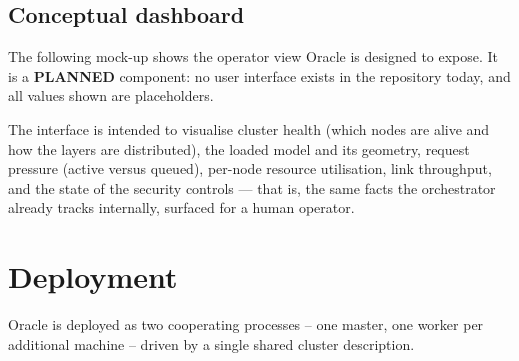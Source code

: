 \documentclass[11pt,a4paper]{article}
\newcommand{\stPlan}{\textcolor{oblue}{\footnotesize\textsf{\textbf{PLANNED}}}}
\begin{document}
\subsection{Conceptual dashboard}

The following mock-up shows the operator view Oracle is designed to expose. It is
a \stPlan{} component: no user interface exists in the repository today, and all
values shown are placeholders.

\begin{center}
\setlength{\fboxsep}{7pt}
\end{center}

The interface is intended to visualise cluster health (which nodes are alive and
how the layers are distributed), the loaded model and its geometry, request
pressure (active versus queued), per-node resource utilisation, link throughput,
and the state of the security controls --- that is, the same facts the
orchestrator already tracks internally, surfaced for a human operator.

\section{Deployment}

Oracle is deployed as two cooperating processes -- one master, one worker per
additional machine -- driven by a single shared cluster description.
\end{document}
